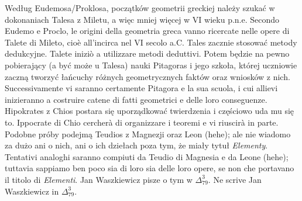 Według Eudemosa/Proklosa, początków geometrii greckiej należy szukać w dokonaniach Talesa z Miletu, a więc mniej więcej w VI wieku p.n.e. %
Secondo Eudemo e Proclo, le origini della geometria greca vanno ricercate nelle opere di Talete di Mileto, cioè all'incirca nel VI secolo a.C. %
Tales zacznie stosować metody dedukcyjne. %
Talete iniziò a utilizzare metodi deduttivi. %
Potem będzie na pewno pobierający (a być może u Talesa) nauki Pitagoras i jego szkoła, której uczniowie zaczną tworzyć łańcuchy różnych geometrycznych faktów oraz wniosków z nich. %
Successivamente vi saranno certamente Pitagora e la sua scuola, i cui allievi inizieranno a costruire catene di fatti geometrici e delle loro conseguenze. %
Hipokrates z Chios postara się uporządkować twierdzenia i częściowo uda mu się to. %
Ippocrate di Chio cercherà di organizzare i teoremi e vi riuscirà in parte. %
Podobne próby podejmą Teudios z Magnezji oraz Leon (hehe); ale nie wiadomo za dużo ani o nich, ani o ich dziełach poza tym, że miały tytuł \emph{Elementy}. %
Tentativi analoghi saranno compiuti da Teudio di Magnesia e da Leone (hehe); tuttavia sappiamo ben poco sia di loro sia delle loro opere, se non che portavano il titolo di \emph{Elementi}. %
Jan Waszkiewicz pisze o tym w $\Delta_{79}^{3}$. %
Ne scrive Jan Waszkiewicz in $\Delta_{79}^{3}$. %

